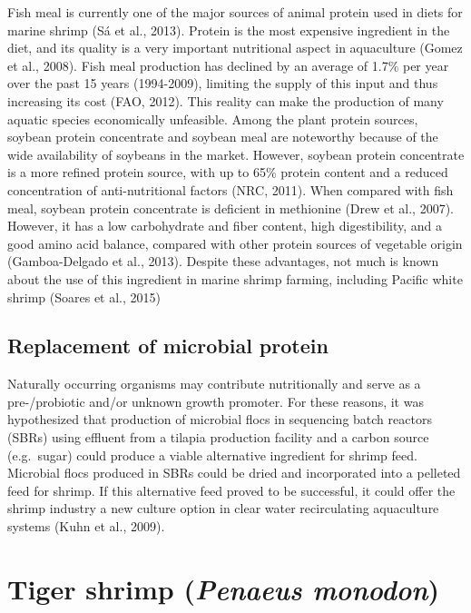 \documentclass[
]{book}
\begin{document}
Fish meal is currently one of the major sources of animal protein used
in diets for marine shrimp (Sá et al., 2013). Protein is the most
expensive ingredient in the diet, and its quality is a very important
nutritional aspect in aquaculture (Gomez et al., 2008). Fish meal
production has declined by an average of 1.7\% per year over the past 15
years (1994-2009), limiting the supply of this input and thus increasing
its cost (FAO, 2012). This reality can make the production of many
aquatic species economically unfeasible. Among the plant protein
sources, soybean protein concentrate and soybean meal are noteworthy
because of the wide availability of soybeans in the market. However,
soybean protein concentrate is a more refined protein source, with up to
65\% protein content and a reduced concentration of anti-nutritional
factors (NRC, 2011). When compared with fish meal, soybean protein
concentrate is deficient in methionine (Drew et al., 2007). However, it
has a low carbohydrate and fiber content, high digestibility, and a good
amino acid balance, compared with other protein sources of vegetable
origin (Gamboa-Delgado et al., 2013). Despite these advantages, not much
is known about the use of this ingredient in marine shrimp farming,
including Pacific white shrimp (Soares et al., 2015)

\hypertarget{replacement-of-microbial-protein}{%
\subsection*{Replacement of microbial protein}\label{replacement-of-microbial-protein}}

Naturally occurring organisms may contribute nutritionally and serve as
a pre-/probiotic and/or unknown growth promoter. For these reasons, it
was hypothesized that production of microbial flocs in sequencing batch
reactors (SBRs) using effluent from a tilapia production facility and a
carbon source (e.g.~sugar) could produce a viable alternative ingredient
for shrimp feed. Microbial flocs produced in SBRs could be dried and
incorporated into a pelleted feed for shrimp. If this alternative feed
proved to be successful, it could offer the shrimp industry a new
culture option in clear water recirculating aquaculture systems (Kuhn et
al., 2009).

\hypertarget{tiger-shrimp-penaeus-monodon}{%
\section{\texorpdfstring{Tiger shrimp (\emph{Penaeus monodon})}{Tiger shrimp (Penaeus monodon)}}\label{tiger-shrimp-penaeus-monodon}}
\end{document}
